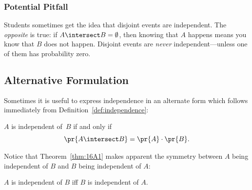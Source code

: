 \subsubsection*{Potential Pitfall}

Students sometimes get the idea that disjoint events are independent.
The \emph{opposite} is true: if $A \intersect B = \emptyset$, then
knowing that $A$ happens means you know that $B$ does not happen.
Disjoint events are \emph{never} independent---unless one of them has
probability zero.

\subsection{Alternative Formulation}

Sometimes it is useful to express independence in an alternate form
which follows immediately from Definition~\ref{def:independence}:

\begin{theorem}\label{thm:16A1}
$A$ is independent of~$B$ if and only if
\begin{equation}\label{eqn:15D3}
    \pr{A \intersect B} = \pr{A} \cdot \pr{B}.
\end{equation}
\end{theorem}

Notice that Theorem~\ref{thm:16A1} makes apparent the symmetry between
$A$ being independent of $B$ and $B$ being independent of $A$:
\begin{corollary}
$A$ is independent of $B$ iff $B$ is independent of $A$.
\end{corollary}

